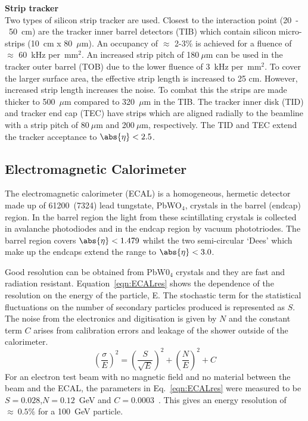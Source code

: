 \textbf{Strip tracker}\\
Two types of silicon strip tracker are used. Closest to the interaction point (20~-~50~cm) are the tracker inner barrel detectors (TIB) which contain silicon micro-strips (10~cm x 80~$\mu$m). An occupancy of $\approx$ 2-3\% is achieved for a fluence of $\approx$ 60~kHz per~mm$^{2}$.
An increased strip pitch of 180$~\mu$m can be used in the tracker outer barrel (TOB) due to the lower fluence of 3~kHz per~mm$^{2}$. To cover the larger surface area, the effective strip length is increased to 25 cm. However, increased strip length increases the noise. To combat this the strips are made thicker to 500~$\mu$m compared to 320~$\mu$m in the TIB.
The tracker inner disk (TID) and tracker end cap (TEC) have strips which are aligned radially to the beamline with a strip pitch of 80$~\mu$m and 200$~\mu$m, respectively. The TID and TEC extend the tracker acceptance to $\abs{\eta}<2.5$.

\subsection{Electromagnetic Calorimeter}

The electromagnetic calorimeter (ECAL) is a homogeneous, hermetic detector made up of 61200~(7324) lead tungstate, PbWO$_{4}$, crystals in the barrel (endcap) region. In the barrel region the light from these scintillating crystals is collected in avalanche photodiodes and in the endcap region by vacuum phototriodes. The barrel region covers $\abs{\eta}<1.479$ whilst the two semi-circular `Dees' which make up the endcaps extend the range to $\abs{\eta}<3.0$.



Good resolution can be obtained from PbW0$_{4}$ crystals and they are fast and radiation resistant. Equation~\ref{eqn:ECALres} shows the dependence of the resolution on the energy of the particle, E. The stochastic term for the statistical fluctuations on the number of secondary particles produced is represented as $S$. The noise from the electronics and digitisation is given by $N$ and the constant term $C$ arises from calibration errors and leakage of the shower outside of the calorimeter. 
\begin{equation}
\left(\frac{\sigma}{E}\right)^2 = \left(\frac{S}{\sqrt{E}}\right)^2 + \left(\frac{N}{E}\right)^2 + C
\label{eqn:ECALres}
\end{equation}
For an electron test beam with no magnetic field and no material between the beam and the ECAL, the parameters in Eq.~\ref{eqn:ECALres} were measured to be $S=0.028$,$N=0.12$~GeV and $C=0.0003$~\cite{1748-0221-2-04-P04004}. This gives an energy resolution of $\approx~0.5\%$ for a 100~GeV particle.


